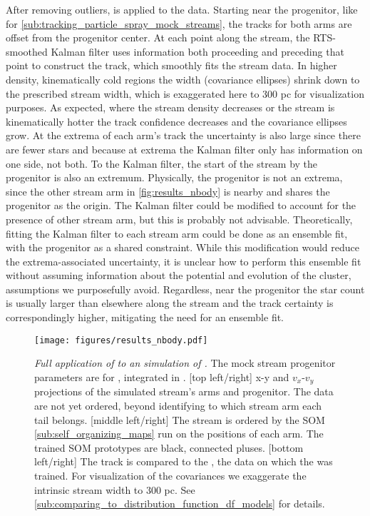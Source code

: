 \documentclass[fleqn,usenatbib]{mnras}
\begin{document}
    After removing outliers, \trackstream{} is applied to the data. Starting
    near the progenitor, like for
    \autoref{sub:tracking_particle_spray_mock_streams}, the tracks for both arms
    are offset from the progenitor center. At each point along the stream, the
    RTS-smoothed Kalman filter uses information both proceeding and preceding
    that point to construct the track, which smoothly fits the stream data. In
    higher density, kinematically cold regions the width (covariance ellipses)
    shrink down to the prescribed stream width, which is exaggerated here to 300
    pc for visualization purposes. As expected, where the stream density
    decreases or the stream is kinematically hotter the track confidence
    decreases and the covariance ellipses grow. At the extrema of each arm's
    track the uncertainty is also large since there are fewer stars and because
    at extrema the Kalman filter only has information on one side, not both. To
    the Kalman filter, the start of the stream by the progenitor is also an
    extremum. Physically, the progenitor is not an extrema, since the other
    stream arm in \autoref{fig:results_nbody} is nearby and shares the
    progenitor as the origin. The Kalman filter could be modified to account for
    the presence of other stream arm, but this is probably not advisable.
    Theoretically, fitting the Kalman filter to each stream arm could be done as
    an ensemble fit, with the progenitor as a shared constraint. While this
    modification would reduce the extrema-associated uncertainty, it is unclear
    how to perform this ensemble fit without assuming information about the
    potential and evolution of the cluster, assumptions we purposefully avoid.
    Regardless, near the progenitor the star count is usually larger than
    elsewhere along the stream and the track certainty is correspondingly
    higher, mitigating the need for an ensemble fit.

    \begin{figure*}
      \centering
      \texttt{[image: figures/results\_nbody.pdf]}
      \caption{
        \emph{Full application of \trackstream{} to an \nbody{} simulation of
        .} The mock stream progenitor parameters are for
        , integrated in \galpyMWPotential.
        [top left/right] x-y and $v_x$-$v_y$ projections of the simulated
        stream's arms and progenitor. The data are not yet ordered, beyond
        identifying to which stream arm each tail belongs.
        [middle left/right] The stream is ordered by the SOM
        \autoref{sub:self_organizing_maps} run on the positions of each arm. The
        trained SOM prototypes are black, connected pluses.
        [bottom left/right] The \trackstream{} track is compared to the
        \nbody{}, the data on which the \trackstream{} was trained. For
        visualization of the covariances we exaggerate the intrinsic stream
        width to 300 pc. See
        \autoref{sub:comparing_to_distribution_function_df_models} for details.
        }
      \label{fig:results_nbody}
    \end{figure*}
\end{document}
